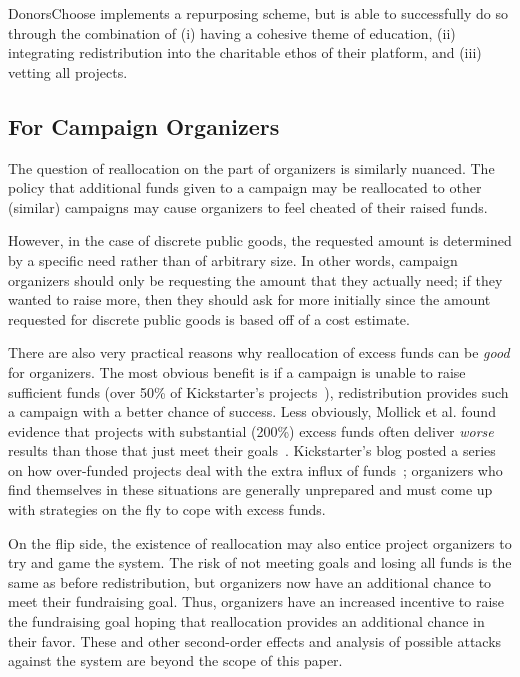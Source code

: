 DonorsChoose implements a repurposing scheme, but is able to successfully do so through the combination of (i) having a cohesive theme of education, (ii) integrating redistribution into the charitable ethos of their platform, and (iii) vetting all projects. 

\subsection{For Campaign Organizers}

The question of reallocation on the part of organizers is similarly nuanced. The policy that additional funds given to a campaign may be reallocated to other (similar) campaigns may cause organizers to feel cheated of their raised funds. 

However, in the case of discrete public goods, the requested amount is determined by a specific need rather than of arbitrary size. In other words, campaign organizers should only be requesting the amount that they actually need; if they wanted to raise more, then they should ask for more initially since the amount requested for discrete public goods is based off of a cost estimate.

There are also very practical reasons why reallocation of excess funds can be \textit{good} for organizers. The most obvious benefit is if a campaign is unable to raise sufficient funds (over 50\% of Kickstarter's projects~\cite{mollick2014dynamics}), redistribution provides such a campaign with a better chance of success. Less obviously, Mollick et al. found evidence that projects with substantial (200\%) excess funds often deliver \textit{worse} results than those that just meet their goals~\cite{mollick2014dynamics}. Kickstarter's blog posted a series on how over-funded projects deal with the extra influx of funds~\cite{excess-blog}; organizers who find themselves in these situations are generally unprepared and must come up with strategies on the fly to cope with excess funds.

On the flip side, the existence of reallocation may also entice project organizers to try and game the system. The risk of not meeting goals and losing all funds is the same as before redistribution, but organizers now have an additional chance to meet their fundraising goal. Thus, organizers have an increased incentive to raise the fundraising goal hoping that reallocation provides an additional chance in their favor. These and other second-order effects and analysis of possible attacks against the system are beyond the scope of this paper. 

